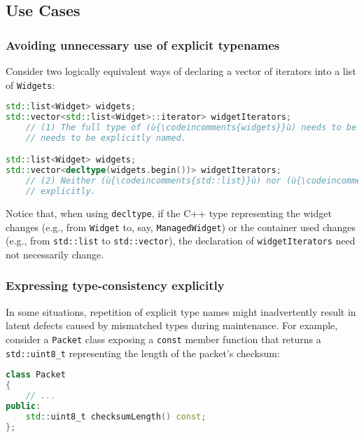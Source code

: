 \subsection[Use Cases]{Use Cases}\label{use-cases-decltype}

\subsubsection[Avoiding unnecessary use of explicit typenames]{Avoiding unnecessary use of explicit typenames}\label{avoiding-unnecessary-use-of-explicit-typenames}

Consider two logically equivalent ways of declaring a vector of
iterators into a list of \lstinline!Widgets!:

\begin{lstlisting}[language=C++]
std::list<Widget> widgets;
std::vector<std::list<Widget>::iterator> widgetIterators;
    // (1) The full type of (ù{\codeincomments{widgets}}ù) needs to be restated, and (ù{\codeincomments{iterator}}ù)
    // needs to be explicitly named.

std::list<Widget> widgets;
std::vector<decltype(widgets.begin())> widgetIterators;
    // (2) Neither (ù{\codeincomments{std::list}}ù) nor (ù{\codeincomments{Widget}}ù) nor (ù{\codeincomments{iterator}}ù) need be named
    // explicitly.
\end{lstlisting}
    
\noindent Notice that, when using \lstinline!decltype!, if the C++ type representing
the widget changes (e.g., from \lstinline!Widget! to, say,
\lstinline!ManagedWidget!) or the container used changes (e.g., from
\lstinline!std::list! to \lstinline!std::vector!), the declaration of
\lstinline!widgetIterators! need not necessarily change.

\subsubsection[Expressing type-consistency explicitly]{Expressing type-consistency explicitly}\label{expressing-type-consistency-explicitly}

In some situations, repetition of explicit type names might
inadvertently result in latent defects caused by mismatched types during
maintenance. For example, consider a \lstinline!Packet! class exposing a
\lstinline!const! member function that returns a \lstinline!std::uint8_t!
representing the length of the packet's checksum:

\begin{lstlisting}[language=C++]
class Packet
{
    // ...
public:
    std::uint8_t checksumLength() const;
};
\end{lstlisting}
    
